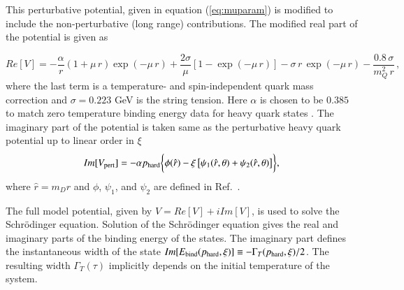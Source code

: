 {{This perturbative potential, given in equation (\ref{eq:muparam}) is modified to include
the non-perturbative (long range) contributions. 
The modified real part of the potential is given as~\cite{Dumitru:2007hy} 


%
\begin{equation} 
\label{eq:repot}
Re[V] = -\frac{\alpha}{r} \left(1+\mu \, r\right) \exp\left( -\mu
\, r  \right) + \frac{2\sigma}{\mu}\left[1-\exp\left( -\mu
\, r  \right)\right] 
 - \sigma \,r\, \exp(-\mu\,r)- \frac{0.8 \, \sigma}{m_Q^2\, r} \, ,
\end{equation}
%
where the last term is a temperature- and spin-independent quark mass correction 
\cite{Bali:1997am} and $\sigma = 0.223$ GeV is the string tension.  Here  $\alpha$ 
is chosen to be  $0.385$ 
to match zero temperature
binding energy data for heavy quark states \cite{Dumitru:2007hy}.
The imaginary part of the potential is taken same as the perturbative heavy quark
potential up to linear order in $\xi$ 
%
\begin{equation} 
Im[V_{\rm pert}] = -\alpha p_{\rm hard} \biggl\{ \phi(\hat{r}) - \xi \left[\psi_1(\hat{r},
\theta)+\psi_2(\hat{r}, \theta)\right]\biggr\} ,
\label{eq:impot}
\end{equation}
%
where $\hat{r}=m_D r$ and $\phi$, $\psi_1$, and $\psi_2$ are defined in Ref.~\cite{Krouppa:2016jcl}. 

 The full model potential, given by $V = Re[V] + i Im[V]$, is used to 
solve the Schr\"odinger equation. 
Solution of the Schr\"odinger equation gives the real and imaginary parts of 
the binding energy of the states.  The imaginary part defines the instantaneous width of the state
$Im[E_{\rm bind}(p_{\rm hard},\xi)] \equiv -\Gamma_T(p_{\rm hard},\xi)/2$. 
The resulting width $\Gamma_T(\tau)$ implicitly depends on the initial temperature of the
system.

}}
